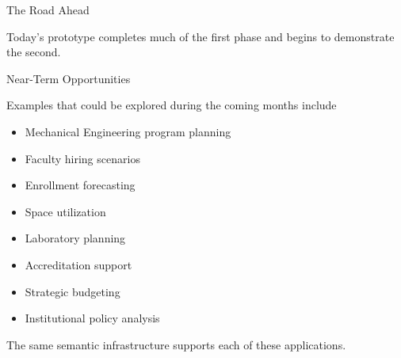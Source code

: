 \documentclass[aspectratio=169]{beamer}
\begin{document}
\begin{frame}{The Road Ahead}

\begin{center}


\end{center}

\vspace{0.8cm}

Today's prototype completes much of the first phase and begins
to demonstrate the second.

\end{frame}

\begin{frame}{Near-Term Opportunities}

Examples that could be explored during the coming months include

\vspace{0.5cm}

\begin{itemize}

\item Mechanical Engineering program planning

\item Faculty hiring scenarios

\item Enrollment forecasting

\item Space utilization

\item Laboratory planning

\item Accreditation support

\item Strategic budgeting

\item Institutional policy analysis

\end{itemize}

\vspace{0.5cm}

The same semantic infrastructure supports each of these applications.

\end{frame}
\end{document}
